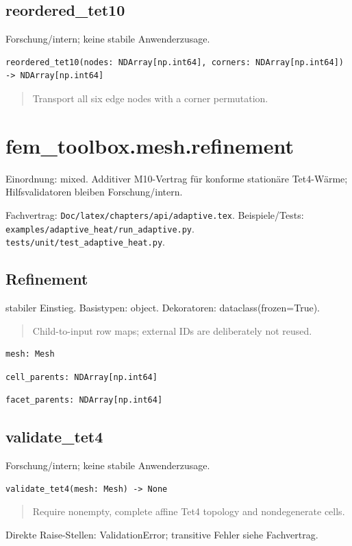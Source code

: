 \subsection{reordered\_tet10}
Forschung/intern; keine stabile Anwenderzusage.
\begin{lstlisting}
reordered_tet10(nodes: NDArray[np.int64], corners: NDArray[np.int64]) -> NDArray[np.int64]
\end{lstlisting}
\begin{quote}
Transport all six edge nodes with a corner permutation.
\end{quote}
\section{fem\_toolbox.mesh.refinement}
Einordnung: mixed. Additiver M10-Vertrag für konforme stationäre Tet4-Wärme; Hilfsvalidatoren bleiben Forschung/intern.
\par Fachvertrag: \nolinkurl{Doc/latex/chapters/api/adaptive.tex}. Beispiele/Tests:
\nolinkurl{examples/adaptive_heat/run_adaptive.py}.
\nolinkurl{tests/unit/test_adaptive_heat.py}.
\subsection{Refinement}
stabiler Einstieg.
Basistypen: object. Dekoratoren: dataclass(frozen=True).
\begin{quote}
Child-to-input row maps; external IDs are deliberately not reused.
\end{quote}
\begin{lstlisting}
mesh: Mesh
\end{lstlisting}
\begin{lstlisting}
cell_parents: NDArray[np.int64]
\end{lstlisting}
\begin{lstlisting}
facet_parents: NDArray[np.int64]
\end{lstlisting}
\subsection{validate\_tet4}
Forschung/intern; keine stabile Anwenderzusage.
\begin{lstlisting}
validate_tet4(mesh: Mesh) -> None
\end{lstlisting}
\begin{quote}
Require nonempty, complete affine Tet4 topology and nondegenerate cells.
\end{quote}
Direkte Raise-Stellen: ValidationError; transitive Fehler siehe Fachvertrag.
